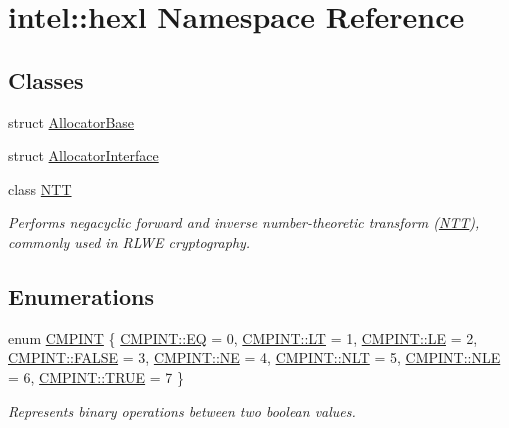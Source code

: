 \hypertarget{namespaceintel_1_1hexl}{}\section{intel\+:\+:hexl Namespace Reference}
\label{namespaceintel_1_1hexl}
\subsection*{Classes}
\begin{DoxyCompactItemize}
\item 
struct \hyperlink{structintel_1_1hexl_1_1AllocatorBase}{Allocator\+Base}
\item 
struct \hyperlink{structintel_1_1hexl_1_1AllocatorInterface}{Allocator\+Interface}
\item 
class \hyperlink{classintel_1_1hexl_1_1NTT}{N\+TT}
\begin{DoxyCompactList}\small\item\em Performs negacyclic forward and inverse number-\/theoretic transform (\hyperlink{classintel_1_1hexl_1_1NTT}{N\+TT}), commonly used in R\+L\+WE cryptography. \end{DoxyCompactList}\end{DoxyCompactItemize}
\subsection*{Enumerations}
\begin{DoxyCompactItemize}
\item 
enum \hyperlink{namespaceintel_1_1hexl_abdcc9d2d5bb10fa95d5f143874508006}{C\+M\+P\+I\+NT} \{ \newline
\hyperlink{namespaceintel_1_1hexl_abdcc9d2d5bb10fa95d5f143874508006a2dcbad7477fd40561e8b8198f173bd47}{C\+M\+P\+I\+N\+T\+::\+EQ} = 0, 
\hyperlink{namespaceintel_1_1hexl_abdcc9d2d5bb10fa95d5f143874508006ac562607189d77eb9dfb707464c1e7b0b}{C\+M\+P\+I\+N\+T\+::\+LT} = 1, 
\hyperlink{namespaceintel_1_1hexl_abdcc9d2d5bb10fa95d5f143874508006acfe6055d2e0503be378bb63449ec7ba6}{C\+M\+P\+I\+N\+T\+::\+LE} = 2, 
\hyperlink{namespaceintel_1_1hexl_abdcc9d2d5bb10fa95d5f143874508006a946003f97ccc52d5d3b54ac0ec31bbfc}{C\+M\+P\+I\+N\+T\+::\+F\+A\+L\+SE} = 3, 
\newline
\hyperlink{namespaceintel_1_1hexl_abdcc9d2d5bb10fa95d5f143874508006adc33066c3993e0d50896e533fd692ce0}{C\+M\+P\+I\+N\+T\+::\+NE} = 4, 
\hyperlink{namespaceintel_1_1hexl_abdcc9d2d5bb10fa95d5f143874508006ad7d6a13c7b311ec8a3c9fcfb1919a2f8}{C\+M\+P\+I\+N\+T\+::\+N\+LT} = 5, 
\hyperlink{namespaceintel_1_1hexl_abdcc9d2d5bb10fa95d5f143874508006aacd748f300c5d189c47807e2a9d6ea57}{C\+M\+P\+I\+N\+T\+::\+N\+LE} = 6, 
\hyperlink{namespaceintel_1_1hexl_abdcc9d2d5bb10fa95d5f143874508006ac0d83f0b82a6b30de8811e69e6d95c61}{C\+M\+P\+I\+N\+T\+::\+T\+R\+UE} = 7
 \}\begin{DoxyCompactList}\small\item\em Represents binary operations between two boolean values. \end{DoxyCompactList}
\end{DoxyCompactItemize}

